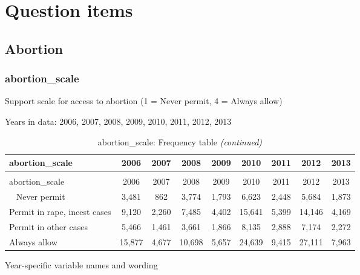 \documentclass[12pt]{article}
\begin{document}
\newpage

\section{Question items}\label{question-items}

\subsection{Abortion}\label{abortion}

\subsubsection{abortion\_scale}\label{abortion_scale}

Support scale for access to abortion (1 = Never permit, 4 = Always
allow)

Years in data: 2006, 2007, 2008, 2009, 2010, 2011, 2012, 2013

\begin{longtable}[t]{lcccccccc}
\caption{\label{tab:unnamed-chunk-4}abortion\_scale: Frequency table}\\
\toprule
abortion\_scale & 2006 & 2007 & 2008 & 2009 & 2010 & 2011 & 2012 & 2013\\
\midrule
\endfirsthead
\caption[]{abortion\_scale: Frequency table \textit{(continued)}}\\
\toprule
abortion\_scale & 2006 & 2007 & 2008 & 2009 & 2010 & 2011 & 2012 & 2013\\
\midrule
\endhead
\
\endfoot
\bottomrule
\endlastfoot
Never permit & 3,481 & 862 & 3,774 & 1,793 & 6,623 & 2,448 & 5,684 & 1,873\\
Permit in rape, incest cases & 9,120 & 2,260 & 7,485 & 4,402 & 15,641 & 5,399 & 14,146 & 4,169\\
Permit in other cases & 5,466 & 1,461 & 3,661 & 1,866 & 8,135 & 2,888 & 7,174 & 2,272\\
Always allow & 15,877 & 4,677 & 10,698 & 5,657 & 24,639 & 9,415 & 27,111 & 7,963\\*
\end{longtable}

Year-specific variable names and wording
\end{document}

